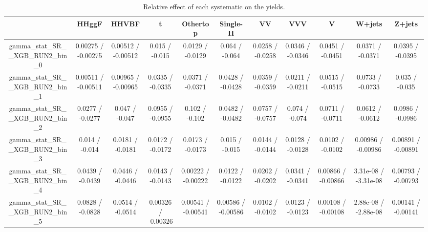 \documentclass[10pt]{article}
\begin{document}
\begin{table}[htbp]
\begin{center}
\begin{tabular}{|c|c|c|c|c|c|c|c|c|c|c|}
\hline 
      & HHggF      & HHVBF      & t      & Othertop      & Single-H      & VV      & VVV      & V      & W+jets      & Z+jets \\ 
\hline 
  gamma_stat_SR__XGB_RUN2_bin_0 & 0.00275 / -0.00275 & 0.00512 / -0.00512 & 0.015 / -0.015 & 0.0129 / -0.0129 & 0.064 / -0.064 & 0.0258 / -0.0258 & 0.0346 / -0.0346 & 0.0451 / -0.0451 & 0.0371 / -0.0371 & 0.0395 / -0.0395 \\ 
  gamma_stat_SR__XGB_RUN2_bin_1 & 0.00511 / -0.00511 & 0.00965 / -0.00965 & 0.0335 / -0.0335 & 0.0371 / -0.0371 & 0.0428 / -0.0428 & 0.0359 / -0.0359 & 0.0211 / -0.0211 & 0.0515 / -0.0515 & 0.0733 / -0.0733 & 0.035 / -0.035 \\ 
  gamma_stat_SR__XGB_RUN2_bin_2 & 0.0277 / -0.0277 & 0.047 / -0.047 & 0.0955 / -0.0955 & 0.102 / -0.102 & 0.0482 / -0.0482 & 0.0757 / -0.0757 & 0.074 / -0.074 & 0.0711 / -0.0711 & 0.0612 / -0.0612 & 0.0986 / -0.0986 \\ 
  gamma_stat_SR__XGB_RUN2_bin_3 & 0.014 / -0.014 & 0.0181 / -0.0181 & 0.0172 / -0.0172 & 0.0173 / -0.0173 & 0.015 / -0.015 & 0.0144 / -0.0144 & 0.0128 / -0.0128 & 0.0102 / -0.0102 & 0.00986 / -0.00986 & 0.00891 / -0.00891 \\ 
  gamma_stat_SR__XGB_RUN2_bin_4 & 0.0439 / -0.0439 & 0.0446 / -0.0446 & 0.0143 / -0.0143 & 0.00222 / -0.00222 & 0.0122 / -0.0122 & 0.0202 / -0.0202 & 0.0341 / -0.0341 & 0.00866 / -0.00866 & 3.31e-08 / -3.31e-08 & 0.00793 / -0.00793 \\ 
  gamma_stat_SR__XGB_RUN2_bin_5 & 0.0828 / -0.0828 & 0.0514 / -0.0514 & 0.00326 / -0.00326 & 0.00541 / -0.00541 & 0.00586 / -0.00586 & 0.0102 / -0.0102 & 0.0123 / -0.0123 & 0.00108 / -0.00108 & 2.88e-08 / -2.88e-08 & 0.00141 / -0.00141 \\ 
\hline 
\end{tabular} 
\caption{Relative effect of each systematic on the yields.} 
\end{center} 
\end{table} 
\end{document}
